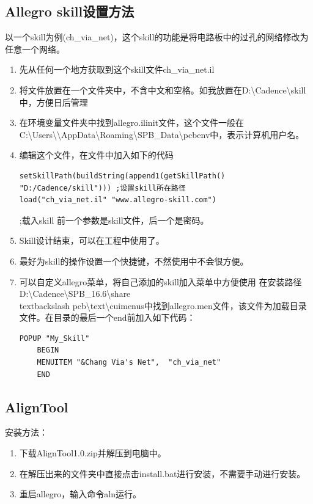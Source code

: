 \documentclass[a4paper,twoside]{article}
\begin{document}
	\subsection{Allegro skill设置方法}
	以一个skill为例(ch\_via\_net)，这个skill的功能是将电路板中的过孔的网络修改为任意一个网络。
		\begin{enumerate}
			\item 先从任何一个地方获取到这个skill文件ch\_via\_net.il
			\item 将文件放置在一个文件夹中，不含中文和空格。如我放置在D:\textbackslash Cadence\textbackslash{skill}中，方便日后管理
			\item 在环境变量文件夹中找到allegro.ilinit文件，这个文件一般在C:\textbackslash Users\textbackslash\*\textbackslash AppData\textbackslash Roaming\textbackslash SPB\_Data\textbackslash pcbenv中，\*表示计算机用户名。
			\item 编辑这个文件，在文件中加入如下的代码
			\begin{lstlisting}
setSkillPath(buildString(append1(getSkillPath() "D:/Cadence/skill"))) ;设置skill所在路径
load("ch_via_net.il" "www.allegro-skill.com")
			\end{lstlisting};载入skill 前一个参数是skill文件，后一个是密码。
			\item Skill设计结束，可以在工程中使用了。
			\item 最好为skill的操作设置一个快捷键，不然使用中不会很方便。
			\item 可以自定义allegro菜单，将自己添加的skill加入菜单中方便使用
  				在安装路径D:\textbackslash Cadence\textbackslash SPB\_16.6\textbackslash share\\textbackslash pcb\textbackslash text\textbackslash cuimenus中找到allegro.men文件，该文件为加载目录文件。在目录的最后一个end前加入如下代码：
  		\begin{lstlisting}
POPUP "My_Skill"
	BEGIN
	MENUITEM "&Chang Via's Net",  "ch_via_net"
	END
		\end{lstlisting}
		\end{enumerate}



	\subsection{AlignTool}
	安装方法：
	\begin{enumerate}
		\item 下载AlignTool1.0.zip并解压到电脑中。
		\item 在解压出来的文件夹中直接点击install.bat进行安装，不需要手动进行安装。
		\item 重启allegro，输入命令aln运行。 
	\end{enumerate}
\end{document}
